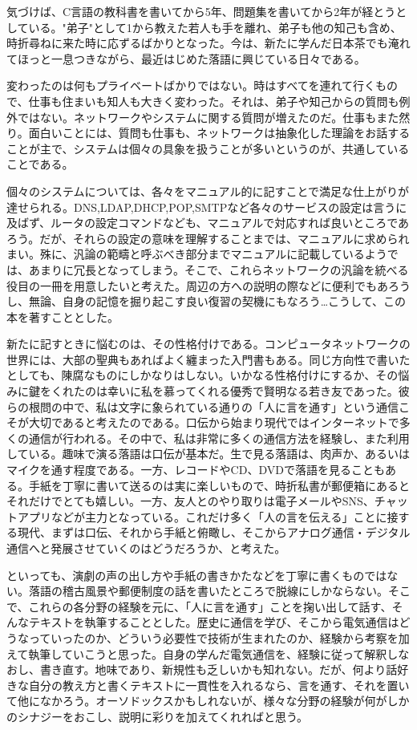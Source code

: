 気づけば、C言語の教科書を書いてから5年、問題集を書いてから2年が経とうとしている。"弟子"として1から教えた若人も手を離れ、弟子も他の知己も含め、時折尋ねに来た時に応ずるばかりとなった。今は、新たに学んだ日本茶でも淹れてほっと一息つきながら、最近はじめた落語に興じている日々である。

変わったのは何もプライベートばかりではない。時はすべてを連れて行くもので、仕事も住まいも知人も大きく変わった。それは、弟子や知己からの質問も例外ではない。ネットワークやシステムに関する質問が増えたのだ。仕事もまた然り。面白いことには、質問も仕事も、ネットワークは抽象化した理論をお話することが主で、システムは個々の具象を扱うことが多いというのが、共通していることである。

個々のシステムについては、各々をマニュアル的に記すことで満足な仕上がりが達せられる。DNS,LDAP,DHCP,POP,SMTPなど各々のサービスの設定は言うに及ばず、ルータの設定コマンドなども、マニュアルで対応すれば良いところであろう。だが、それらの設定の意味を理解することまでは、マニュアルに求められまい。殊に、汎論の範疇と呼ぶべき部分までマニュアルに記載しているようでは、あまりに冗長となってしまう。そこで、これらネットワークの汎論を統べる役目の一冊を用意したいと考えた。周辺の方への説明の際などに便利でもあろうし、無論、自身の記憶を掘り起こす良い復習の契機にもなろう…こうして、この本を著すこととした。

新たに記すときに悩むのは、その性格付けである。コンピュータネットワークの世界には、大部の聖典もあればよく纏まった入門書もある。同じ方向性で書いたとしても、陳腐なものにしかなりはしない。いかなる性格付けにするか、その悩みに鍵をくれたのは幸いに私を慕ってくれる優秀で賢明なる若き友であった。彼らの根問の中で、私は文字に象られている通りの「人に言を通す」という通信こそが大切であると考えたのである。口伝から始まり現代ではインターネットで多くの通信が行われる。その中で、私は非常に多くの通信方法を経験し、また利用している。趣味で演る落語は口伝が基本だ。生で見る落語は、肉声か、あるいはマイクを通す程度である。一方、レコードやCD、DVDで落語を見ることもある。手紙を丁寧に書いて送るのは実に楽しいもので、時折私書が郵便箱にあるとそれだけでとても嬉しい。一方、友人とのやり取りは電子メールやSNS、チャットアプリなどが主力となっている。これだけ多く「人の言を伝える」ことに接する現代、まずは口伝、それから手紙と俯瞰し、そこからアナログ通信・デジタル通信へと発展させていくのはどうだろうか、と考えた。

といっても、演劇の声の出し方や手紙の書きかたなどを丁寧に書くものではない。落語の稽古風景や郵便制度の話を書いたところで脱線にしかならない。そこで、これらの各分野の経験を元に、「人に言を通す」ことを掬い出して話す、そんなテキストを執筆することとした。歴史に通信を学び、そこから電気通信はどうなっていったのか、どういう必要性で技術が生まれたのか、経験から考察を加えて執筆していこうと思った。自身の学んだ電気通信を、経験に従って解釈しなおし、書き直す。地味であり、新規性も乏しいかも知れない。だが、何より話好きな自分の教え方と書くテキストに一貫性を入れるなら、言を通す、それを置いて他になかろう。オーソドックスかもしれないが、様々な分野の経験が何がしかのシナジーをおこし、説明に彩りを加えてくれればと思う。

